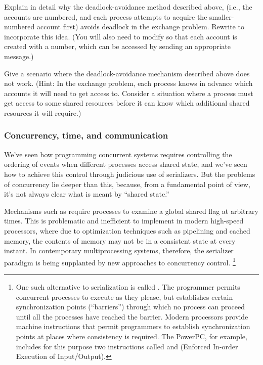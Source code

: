 \begin{exercise}
	\label{Exercise 3.48}
	Explain in detail why the deadlock-avoidance method described above, (i.e., the accounts are numbered, and each process attempts to acquire the smaller-numbered account first) avoids deadlock in the exchange problem.
	Re\-write  to incorporate this idea.
	(You will also need to modify  so that each account is created with a number, which can be accessed by sending an appropriate message.)
\end{exercise}



\begin{exercise}
	\label{Exercise 3.49}
	Give a scenario where the deadlock-avoid\-ance mechanism described above does not work.
	(Hint:
	In the exchange problem, each process knows in advance which accounts it will need to get access to.
	Consider a situation where a process must get access to some shared resources before it can know which additional shared resources it will require.)
\end{exercise}



\subsubsection*{Concurrency, time, and communication}

We’ve seen how programming concurrent systems requires controlling the ordering of events when different processes access shared state, and we’ve seen how to achieve this control through judicious use of serializers.
But the problems of concurrency lie deeper than this, because, from a fundamental point of view, it’s not always clear what is meant by “shared state.”

Mechanisms such as  require processes to examine a global shared flag at arbitrary times.
This is problematic and inefficient to implement in modern high-speed processors, where due to optimization techniques such as pipelining and cached memory, the contents of memory may not be in a consistent state at every instant.
In contemporary multiprocessing systems, therefore, the serializer paradigm is being supplanted by new approaches to concurrency control.%
\footnote{
	One such alternative to serialization is called .
	The programmer permits concurrent processes to execute as they please, but establishes certain synchronization points (“barriers”) through which no process can proceed until all the processes have reached the barrier.
	Modern processors provide machine instructions that permit programmers to establish synchronization points at places where consistency is required.
	The PowerPC, for example, includes for this purpose two instructions called  and  (Enforced In-order Execution of Input/Output).
}

